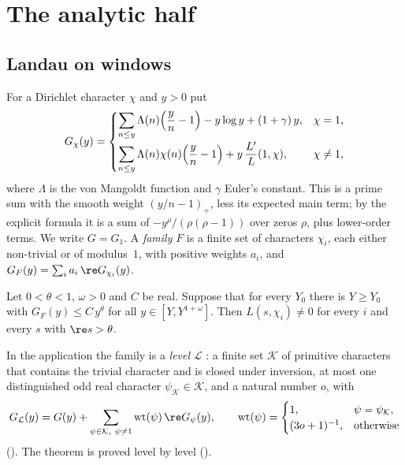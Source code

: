 \section{The analytic half}\label{sec:analytic}

\subsection{Landau on windows}\label{sec:landau}
For a Dirichlet character $\chi$ and $y>0$ put \lvS
\begin{equation}\label{eq:G}
G_\chi(y)=
\begin{cases}
\displaystyle\sum_{n\le y}\Lambda(n)\Bigl(\frac yn-1\Bigr)-y\log y+(1+\gamma)\,y, & \chi=1,\\[1.2em]
\displaystyle\sum_{n\le y}\Lambda(n)\chi(n)\Bigl(\frac yn-1\Bigr)+y\,\frac{L'}{L}(1,\chi), & \chi\neq1,
\end{cases}
\end{equation}
where $\Lambda$ is the von Mangoldt function and $\gamma$ Euler's constant. This is a prime
sum with the smooth weight $(y/n-1)_+$, less its expected main term; by the explicit formula
\cite{montgomery2007multiplicative}
it is a sum of $-y^{\rho}/(\rho(\rho-1))$ over zeros $\rho$, plus lower-order terms. We write
$G=G_1$. A \emph{family} $F$ is a finite set of characters $\chi_i$, each either non-trivial or
of modulus~$1$, with positive weights $a_i$, and
$G_F(y)=\sum_i a_i\,\re G_{\chi_i}(y)$.

\begin{statement}\label{st:landau}
Let $0<\theta<1$, $\omega>0$ and $C$ be real. Suppose that for every $Y_0$ there is $Y\ge Y_0$
with $G_F(y)\le C\,y^{\theta}$ for all $y\in[Y,Y^{1+\omega}]$. Then $L(s,\chi_i)\neq0$ for
every $i$ and every $s$ with $\re s>\theta$.
\end{statement}

In the application the family is a \emph{level} $\mathcal L$ \lvS: a finite set $\mathcal K$ of
primitive characters that contains the trivial character and is closed under inversion, at most
one distinguished odd real character $\psi_{\mathcal K}\in\mathcal K$, and a natural number $o$, with
\begin{equation}\label{eq:level}
G_{\mathcal L}(y)=G(y)+\sum_{\psi\in\mathcal K,\ \psi\neq1}\mathrm{wt}(\psi)\,\re G_\psi(y),\qquad
\mathrm{wt}(\psi)=\begin{cases}1,&\psi=\psi_{\mathcal K},\\ (3o+1)^{-1},&\text{otherwise}\end{cases}
\end{equation}
(). The theorem is proved level by level ().


